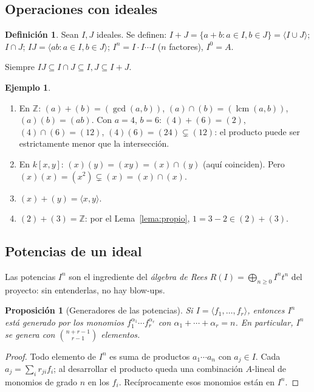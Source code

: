 \documentclass[11pt,a4paper]{article}
\newcommand{\ZZ}{\mathbb{Z}}
\newcommand{\gen}[1]{\langle #1\rangle}
\theoremstyle{plain}
\newtheorem{proposicion}[teorema]{Proposición}
\theoremstyle{definition}
\newtheorem{definicion}[teorema]{Definición}
\newtheorem{ejemplo}[teorema]{Ejemplo}
\theoremstyle{remark}
\newcounter{ej}
\begin{document}
\subsection{Operaciones con ideales}

\begin{definicion}
Sean $I,J$ ideales. Se definen: $I+J=\{a+b:a\in I,b\in J\}=\gen{I\cup J}$; $I\cap J$; $IJ=\gen{ab:a\in I,b\in J}$; $I^n=I\cdot I\cdots I$ ($n$ factores), $I^0=A$.
\end{definicion}

Siempre $IJ\subseteq I\cap J\subseteq I,J\subseteq I+J$.

\begin{ejemplo}\label{ej:operaciones}
\begin{enumerate}[label=(\alph*),itemsep=2pt]
\item En $\ZZ$: $(a)+(b)=(\gcd(a,b))$, $(a)\cap(b)=(\operatorname{lcm}(a,b))$, $(a)(b)=(ab)$. Con $a=4$, $b=6$: $(4)+(6)=(2)$, $(4)\cap(6)=(12)$, $(4)(6)=(24)\subsetneq(12)$: el producto puede ser estrictamente menor que la intersección.
\item En $k[x,y]$: $(x)(y)=(xy)=(x)\cap(y)$ (aquí coinciden). Pero $(x)(x)=(x^2)\subsetneq(x)=(x)\cap(x)$.
\item $(x)+(y)=\gen{x,y}$.
\item $(2)+(3)=\ZZ$: por el Lema~\ref{lema:propio}, $1=3-2\in(2)+(3)$.
\end{enumerate}
\end{ejemplo}

\subsection{Potencias de un ideal}

Las potencias $I^n$ son el ingrediente del \emph{álgebra de Rees} $R(I)=\bigoplus_{n\ge0}I^nt^n$ del proyecto: sin entenderlas, no hay blow-ups.

\begin{proposicion}[Generadores de las potencias]\label{prop:potencias}
Si $I=\gen{f_1,\dots,f_r}$, entonces $I^n$ está generado por los monomios $f_1^{\alpha_1}\cdots f_r^{\alpha_r}$ con $\alpha_1+\cdots+\alpha_r=n$. En particular, $I^n$ se genera con $\binom{n+r-1}{r-1}$ elementos.
\end{proposicion}
\begin{proof}
Todo elemento de $I^n$ es suma de productos $a_1\cdots a_n$ con $a_j\in I$. Cada $a_j=\sum_i r_{ji}f_i$; al desarrollar el producto queda una combinación $A$-lineal de monomios de grado $n$ en los $f_i$. Recíprocamente esos monomios están en $I^n$.
\end{proof}
\end{document}
